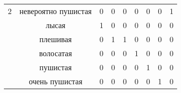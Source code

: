 \begin{table}[H]
\begin{tabular}{|c|c|ccccccc|}
		\multirow{-6}{*}{{\color[HTML]{333333} 2}}                                 & невероятно пушистая                        & \multicolumn{1}{c|}{{\color[HTML]{333333} 0}} & \multicolumn{1}{c|}{{\color[HTML]{333333} 0}} & \multicolumn{1}{c|}{0}     & \multicolumn{1}{c|}{0}      & \multicolumn{1}{c|}{0}      & \multicolumn{1}{c|}{0}        & \multicolumn{1}{c|}{1}                       \\ \cline{1-9}
		{\color[HTML]{333333} }                                                    & лысая                                 & \multicolumn{1}{c|}{1}                        & \multicolumn{1}{c|}{0}                        & \multicolumn{1}{c|}{0}     & \multicolumn{1}{c|}{0}      & \multicolumn{1}{c|}{0}      & \multicolumn{1}{c|}{0}        & \multicolumn{1}{c|}{0}  \\ \cline{2-9}
		{\color[HTML]{333333} }                                                    & {\color[HTML]{333333} плешивая}    & \multicolumn{1}{c|}{{\color[HTML]{333333} 0}} & \multicolumn{1}{c|}{{\color[HTML]{333333} 1}} & \multicolumn{1}{c|}{1}     & \multicolumn{1}{c|}{0}      & \multicolumn{1}{c|}{0}      & \multicolumn{1}{c|}{0}        & \multicolumn{1}{c|}{0}                       \\ \cline{2-9}
		{\color[HTML]{333333} }                                                    & {\color[HTML]{333333} волосатая}    & \multicolumn{1}{c|}{{\color[HTML]{333333} 0}} & \multicolumn{1}{c|}{{\color[HTML]{333333} 0}} & \multicolumn{1}{c|}{0}     & \multicolumn{1}{c|}{1}      & \multicolumn{1}{c|}{0}      & \multicolumn{1}{c|}{0}        & \multicolumn{1}{c|}{0}                       \\ \cline{2-9}
		{\color[HTML]{333333} }                                                    & {\color[HTML]{333333} пушистая}             & \multicolumn{1}{c|}{{\color[HTML]{333333} 0}} & \multicolumn{1}{c|}{{\color[HTML]{333333} 0}} & \multicolumn{1}{c|}{0}     & \multicolumn{1}{c|}{0}      & \multicolumn{1}{c|}{1}      & \multicolumn{1}{c|}{0}        & \multicolumn{1}{c|}{0}                       \\ \cline{2-9}
		{\color[HTML]{333333} }                                                    & {\color[HTML]{333333} очень пушистая}       & \multicolumn{1}{c|}{{\color[HTML]{333333} 0}} & \multicolumn{1}{c|}{{\color[HTML]{333333} 0}} & \multicolumn{1}{c|}{0}     & \multicolumn{1}{c|}{0}      & \multicolumn{1}{c|}{0}      & \multicolumn{1}{c|}{1}        & \multicolumn{1}{c|}{0}                       \\ \cline{2-9}

\end{tabular}
\end{table}
